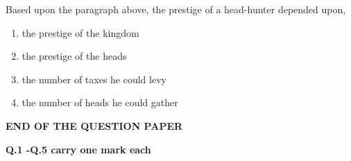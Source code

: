 \documentclass[journal,12pt,onecolumn]{IEEEtran}
\begin{document}
\begin{enumerate}[itemsep=0.5cm]
Based upon the paragraph above, the prestige of a head-hunter depended upon, 

\hfill{}

\begin{enumerate}
    \item the prestige of the kingdom
    \item the prestige of the heads
    \item the number of taxes he could levy
    \item the number of heads he could gather
\end{enumerate}


\vspace{5em}


\begin{center}
    \large\textbf{END OF THE QUESTION PAPER}
\end{center}

\end{enumerate}

\newpage

\textbf{Q.1 -Q.5 carry one mark each}

\vspace{2em}
\end{document}
